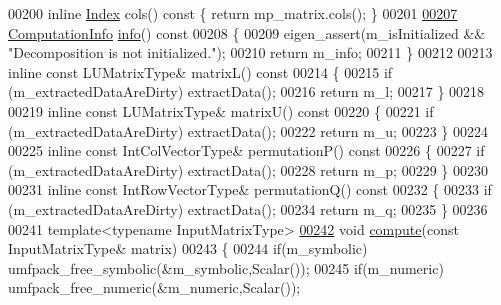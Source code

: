 \begin{DoxyCode}
00200     \textcolor{keyword}{inline} \hyperlink{namespace_eigen_a62e77e0933482dafde8fe197d9a2cfde}{Index} cols()\textcolor{keyword}{ const }\{ \textcolor{keywordflow}{return} mp\_matrix.cols(); \}
00201 
\hyperlink{class_eigen_1_1_umf_pack_l_u_a68738a0d99c67316877706f98b033402}{00207}     \hyperlink{group__enums_ga85fad7b87587764e5cf6b513a9e0ee5e}{ComputationInfo} \hyperlink{class_eigen_1_1_umf_pack_l_u_a68738a0d99c67316877706f98b033402}{info}()\textcolor{keyword}{ const}
00208 \textcolor{keyword}{    }\{
00209       eigen\_assert(m\_isInitialized && \textcolor{stringliteral}{"Decomposition is not initialized."});
00210       \textcolor{keywordflow}{return} m\_info;
00211     \}
00212 
00213     \textcolor{keyword}{inline} \textcolor{keyword}{const} LUMatrixType& matrixL()\textcolor{keyword}{ const}
00214 \textcolor{keyword}{    }\{
00215       \textcolor{keywordflow}{if} (m\_extractedDataAreDirty) extractData();
00216       \textcolor{keywordflow}{return} m\_l;
00217     \}
00218 
00219     \textcolor{keyword}{inline} \textcolor{keyword}{const} LUMatrixType& matrixU()\textcolor{keyword}{ const}
00220 \textcolor{keyword}{    }\{
00221       \textcolor{keywordflow}{if} (m\_extractedDataAreDirty) extractData();
00222       \textcolor{keywordflow}{return} m\_u;
00223     \}
00224 
00225     \textcolor{keyword}{inline} \textcolor{keyword}{const} IntColVectorType& permutationP()\textcolor{keyword}{ const}
00226 \textcolor{keyword}{    }\{
00227       \textcolor{keywordflow}{if} (m\_extractedDataAreDirty) extractData();
00228       \textcolor{keywordflow}{return} m\_p;
00229     \}
00230 
00231     \textcolor{keyword}{inline} \textcolor{keyword}{const} IntRowVectorType& permutationQ()\textcolor{keyword}{ const}
00232 \textcolor{keyword}{    }\{
00233       \textcolor{keywordflow}{if} (m\_extractedDataAreDirty) extractData();
00234       \textcolor{keywordflow}{return} m\_q;
00235     \}
00236 
00241     \textcolor{keyword}{template}<\textcolor{keyword}{typename} InputMatrixType>
\hyperlink{class_eigen_1_1_umf_pack_l_u_a05fb2b5717ebd67e46b83439721ceee7}{00242}     \textcolor{keywordtype}{void} \hyperlink{class_eigen_1_1_umf_pack_l_u_a05fb2b5717ebd67e46b83439721ceee7}{compute}(\textcolor{keyword}{const} InputMatrixType& matrix)
00243     \{
00244       \textcolor{keywordflow}{if}(m\_symbolic) umfpack\_free\_symbolic(&m\_symbolic,Scalar());
00245       \textcolor{keywordflow}{if}(m\_numeric)  umfpack\_free\_numeric(&m\_numeric,Scalar());

\end{DoxyCode}

